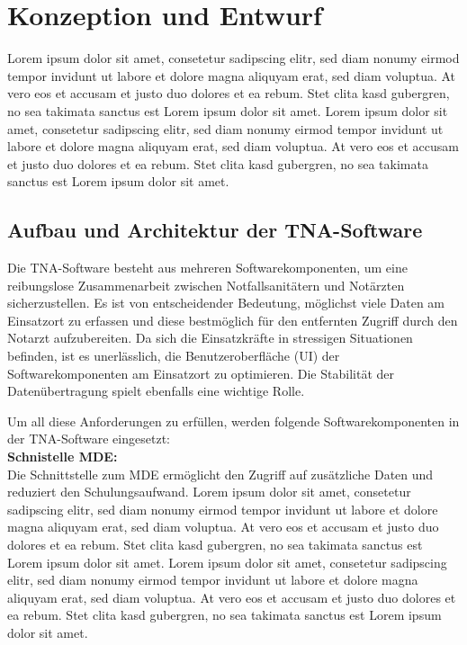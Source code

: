 
\chapter{Konzeption und Entwurf}
Lorem ipsum dolor sit amet, consetetur sadipscing
elitr, sed diam nonumy eirmod tempor invidunt ut labore
et dolore magna aliquyam erat, sed diam voluptua. At vero eos et
accusam et justo duo dolores et ea rebum. Stet clita kasd gubergren, 
no sea takimata sanctus est Lorem ipsum dolor sit amet. Lorem ipsum dolor 
sit amet, consetetur sadipscing elitr, sed diam nonumy eirmod tempor 
invidunt ut labore et dolore magna aliquyam erat, sed diam voluptua. 
At vero eos et accusam et justo duo dolores et ea rebum. Stet clita kasd 
gubergren, no sea takimata sanctus est Lorem ipsum dolor sit amet.

\section{Aufbau und Architektur der TNA-Software}


Die TNA-Software besteht aus mehreren Softwarekomponenten, um eine reibungslose Zusammenarbeit zwischen Notfallsanitätern und Notärzten sicherzustellen. Es ist von entscheidender Bedeutung, möglichst viele Daten am Einsatzort zu erfassen und diese bestmöglich für den entfernten Zugriff durch den Notarzt aufzubereiten. Da sich die Einsatzkräfte in stressigen Situationen befinden, ist es unerlässlich, die Benutzeroberfläche (UI) der Softwarekomponenten am Einsatzort zu optimieren. Die Stabilität der Datenübertragung spielt ebenfalls eine wichtige Rolle.

Um all diese Anforderungen zu erfüllen, werden folgende Softwarekomponenten in der TNA-Software eingesetzt:\\

\textbf{Schnistelle \ac{MDE}:}\\
Die Schnittstelle zum MDE ermöglicht den Zugriff auf zusätzliche Daten und reduziert den Schulungsaufwand.
Lorem ipsum dolor sit amet, consetetur sadipscing elitr, sed diam nonumy eirmod tempor invidunt ut labore et dolore magna aliquyam erat, sed diam voluptua. At vero eos et accusam et justo duo dolores et ea rebum. Stet clita kasd gubergren, no sea takimata sanctus est Lorem ipsum dolor sit amet. Lorem ipsum dolor sit amet, consetetur sadipscing elitr, sed diam nonumy eirmod tempor invidunt ut labore et dolore magna aliquyam erat, sed diam voluptua. At vero eos et accusam et justo duo dolores et ea rebum. Stet clita kasd gubergren, no sea takimata sanctus est Lorem ipsum dolor sit amet.\\

